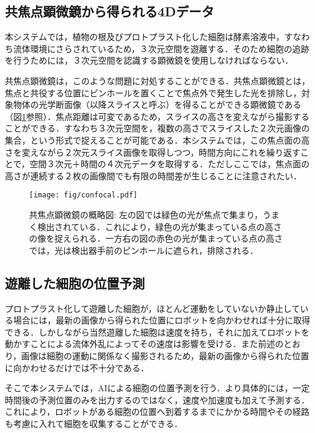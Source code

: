     \subsection{共焦点顕微鏡から得られる4Dデータ}
    本システムでは，植物の根及びプロトプラスト化した細胞は酵素溶液中，すなわち流体環境にさらされているため，３次元空間を遊離する．そのため細胞の追跡を行うためには，３次元空間を認識する顕微鏡を使用しなければならない．
    \par
    共焦点顕微鏡は，このような問題に対処することができる．共焦点顕微鏡とは，焦点と共役する位置にピンホールを置くことで焦点外で発生した光を排除し，対象物体の光学断面像（以降スライスと呼ぶ）を得ることができる顕微鏡である（図\ref{fig:confocal}参照）．焦点距離は可変であるため，スライスの高さを変えながら撮影することができる．すなわち３次元空間を，複数の高さでスライスした２次元画像の集合，という形式で捉えることが可能である．本システムでは，この焦点面の高さを変えながら２次元スライス画像を取得しつつ，時間方向にこれを繰り返すことで，空間３次元＋時間の４次元データを取得する．ただしここでは，焦点面の高さが連続する２枚の画像間でも有限の時間差が生じることに注意されたい．

    \begin{figure}[t]
        \centering
        \texttt{[image: fig/confocal.pdf]}
        \caption[共焦点顕微鏡の概略図]{共焦点顕微鏡の概略図: 左の図では緑色の光が焦点で集まり，うまく検出されている．これにより，緑色の光が集まっている点の高さの像を捉えられる．一方右の図の赤色の光が集まっている点の高さでは，光は検出器手前のピンホールに遮られ，排除される．}
        \label{fig:confocal}
    \end{figure}

    \subsection{遊離した細胞の位置予測}
    プロトプラスト化して遊離した細胞が，ほとんど運動をしていないか静止している場合には，最新の画像から得られた位置にロボットを向かわせれば十分に取得できる．しかしながら当然遊離した細胞は速度を持ち，それに加えてロボットを動かすことによる流体外乱によってその速度は影響を受ける．また前述のとおり，画像は細胞の運動に関係なく撮影されるため，最新の画像から得られた位置に向かわせるだけでは不十分である．
    \par
    そこで本システムでは，AIによる細胞の位置予測を行う．より具体的には，一定時間後の予測位置のみを出力するのではなく，速度や加速度も加えて予測する．これにより，ロボットがある細胞の位置へ到着するまでにかかる時間やその経路も考慮に入れて細胞を収集することができる．

